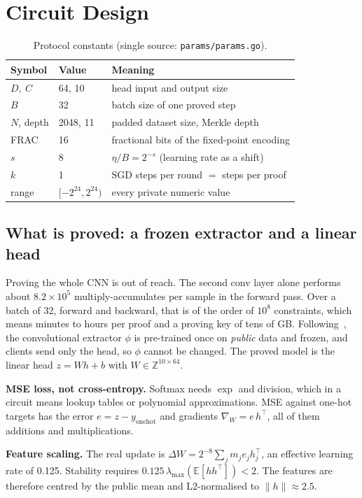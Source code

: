 \documentclass[conference]{IEEEtran}
\newcommand{\code}[1]{\texttt{\small #1}}
\begin{document}
\section{Circuit Design}\label{sec:circuit}
\begin{table}[t]
\centering\footnotesize\caption{Protocol constants (single source: \code{params/params.go}).}\label{tab:params}
\begin{tabular}{@{}lll@{}}
\toprule
Symbol & Value & Meaning\\\midrule
$D,\ C$ & 64, 10 & head input and output size\\
$B$ & 32 & batch size of one proved step\\
$N$, depth & 2048, 11 & padded dataset size, Merkle depth\\
FRAC & 16 & fractional bits of the fixed-point encoding\\
$s$ & 8 & $\eta/B=2^{-s}$ (learning rate as a shift)\\
$k$ & 1 & SGD steps per round $=$ steps per proof\\
range & $[-2^{24},2^{24})$ & every private numeric value\\\bottomrule
\end{tabular}
\end{table}

\subsection{What is proved: a frozen extractor and a linear head}
Proving the whole CNN is out of reach. The second conv layer alone performs about $8.2\times10^5$
multiply-accumulates per sample in the forward pass. Over a batch of 32, forward and backward, that
is of the order of $10^8$ constraints, which means minutes to hours per proof and a proving key of
tens of GB. Following~\cite{zkdesign}, the convolutional extractor $\phi$ is pre-trained once on
\emph{public} data and frozen, and clients send only the head, so $\phi$ cannot be changed. The
proved model is the linear head $z=Wh+b$ with $W\in\mathbb{Z}^{10\times64}$.

\textbf{MSE loss, not cross-entropy.} Softmax needs $\exp$ and division, which in a circuit means
lookup tables or polynomial approximations. MSE against one-hot targets has the error
$e=z-y_{\text{onehot}}$ and gradients $\nabla_W=e\,h^\top$, all of them additions and
multiplications.

\textbf{Feature scaling.} The real update is $\Delta W=2^{-8}\sum_j m_je_jh_j^\top$, an effective
learning rate of 0.125. Stability requires $0.125\,\lambda_{\max}(\mathbb{E}[hh^\top])<2$. The
features are therefore centred by the public mean and L2-normalised to $\|h\|\approx2.5$.
\end{document}

